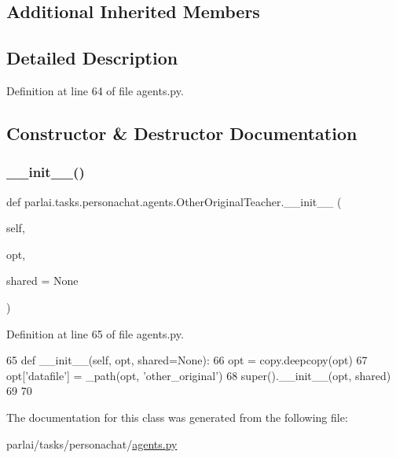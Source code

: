 \subsection*{Additional Inherited Members}


\subsection{Detailed Description}


Definition at line 64 of file agents.\+py.



\subsection{Constructor \& Destructor Documentation}
\mbox{\label{classparlai_1_1tasks_1_1personachat_1_1agents_1_1OtherOriginalTeacher_abd6f89edfdb5f7594fc3e63cc1c940b8}} 
\subsubsection{\texorpdfstring{\+\_\+\+\_\+init\+\_\+\+\_\+()}{\_\_init\_\_()}}
{\footnotesize\ttfamily def parlai.\+tasks.\+personachat.\+agents.\+Other\+Original\+Teacher.\+\_\+\+\_\+init\+\_\+\+\_\+ (\begin{DoxyParamCaption}\item[{}]{self,  }\item[{}]{opt,  }\item[{}]{shared = {\ttfamily None} }\end{DoxyParamCaption})}



Definition at line 65 of file agents.\+py.


\begin{DoxyCode}
65     \textcolor{keyword}{def }\_\_init\_\_(self, opt, shared=None):
66         opt = copy.deepcopy(opt)
67         opt[\textcolor{stringliteral}{'datafile'}] = \_path(opt, \textcolor{stringliteral}{'other\_original'})
68         super().\_\_init\_\_(opt, shared)
69 
70 
\end{DoxyCode}


The documentation for this class was generated from the following file\+:\begin{DoxyCompactItemize}
\item 
parlai/tasks/personachat/\hyperlink{parlai_2tasks_2personachat_2agents_8py}{agents.\+py}\end{DoxyCompactItemize}
